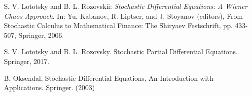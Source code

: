 \documentclass{article}
\numberwithin{equation}{section}
\begin{document}
\begin{thebibliography}{99}
 S. V. Lototsky and B. L. Rozovskii: {\it Stochastic Differential Equations: A Wiener Chaos Approach}. 
In: Yu. Kabanov, R. Liptser, and J. Stoyanov (editors),
From Stochastic Calculus to Mathematical Finance: The Shiryaev Festschrift, pp. 433-507, Springer, 2006.

 S. V. Lototsky and B. L. Rozovsky. Stochastic Partial Differential Equations. Springer, 2017.
% 


% 
% 


 B. Oksendal, Stochastic Differential Equations, An Introduction with Applications. Springer. (2003)


\end{thebibliography}
\end{document}
